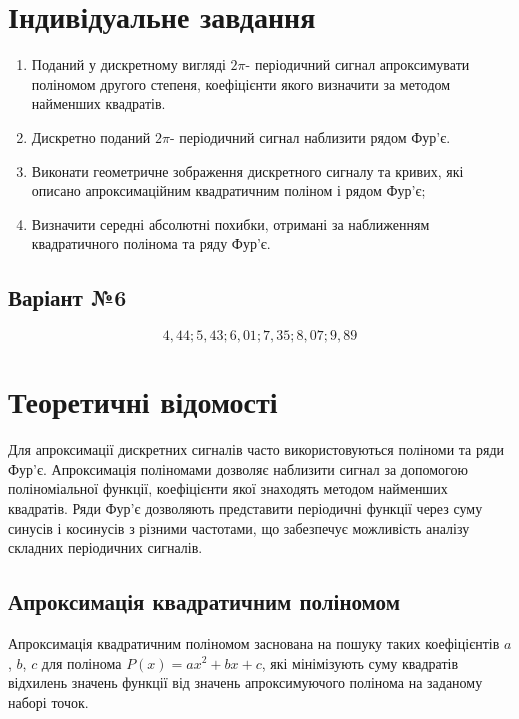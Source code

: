 \documentclass[oneside,14pt]{extarticle}
\begin{document}
\begin{normalsize}
	\section*{Індивідуальне завдання}
	\begin{enumerate}
		\item Поданий у дискретному вигляді $2\pi$- періодичний сигнал апроксимувати
поліномом другого степеня, коефіцієнти якого визначити за методом найменших
квадратів.
		\item Дискретно поданий $2\pi$- періодичний сигнал наблизити рядом Фур’є.
		\item Виконати геометричне зображення дискретного сигналу та кривих, які
описано апроксимаційним квадратичним поліном і рядом Фур’є;
		\item Визначити середні абсолютні похибки, отримані за наближенням
квадратичного полінома та ряду Фур’є.
	\end{enumerate}
	
	\subsection*{Варіант №6}
	
	\begin{equation}
		4,44; 5,43; 6,01; 7,35; 8,07; 9,89\nonumber
	\end{equation}
	
	\section*{Теоретичні відомості}

Для апроксимації дискретних сигналів часто використовуються поліноми та ряди Фур'є. Апроксимація поліномами дозволяє наблизити сигнал за допомогою поліноміальної функції, коефіцієнти якої знаходять методом найменших квадратів. Ряди Фур'є дозволяють представити періодичні функції через суму синусів і косинусів з різними частотами, що забезпечує можливість аналізу складних періодичних сигналів.

\subsection*{Апроксимація квадратичним поліномом}

Апроксимація квадратичним поліномом заснована на пошуку таких коефіцієнтів \(a\), \(b\), \(c\) для полінома \(P(x) = ax^2 + bx + c\), які мінімізують суму квадратів відхилень значень функції від значень апроксимуючого полінома на заданому наборі точок.


\end{normalsize}
\end{document}
